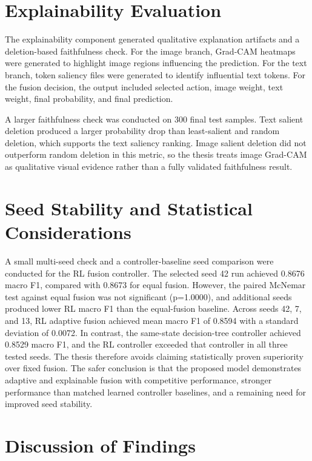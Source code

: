 \section{Explainability Evaluation}


The explainability component generated qualitative explanation artifacts and a deletion-based faithfulness check. For the image branch, Grad-CAM heatmaps were generated to highlight image regions influencing the prediction. For the text branch, token saliency files were generated to identify influential text tokens. For the fusion decision, the output included selected action, image weight, text weight, final probability, and final prediction.


A larger faithfulness check was conducted on 300 final test samples. Text salient deletion produced a larger probability drop than least-salient and random deletion, which supports the text saliency ranking. Image salient deletion did not outperform random deletion in this metric, so the thesis treats image Grad-CAM as qualitative visual evidence rather than a fully validated faithfulness result.


\section{Seed Stability and Statistical Considerations}


A small multi-seed check and a controller-baseline seed comparison were conducted for the RL fusion controller. The selected seed 42 run achieved 0.8676 macro F1, compared with 0.8673 for equal fusion. However, the paired McNemar test against equal fusion was not significant (p=1.0000), and additional seeds produced lower RL macro F1 than the equal-fusion baseline. Across seeds 42, 7, and 13, RL adaptive fusion achieved mean macro F1 of 0.8594 with a standard deviation of 0.0072. In contrast, the same-state decision-tree controller achieved 0.8529 macro F1, and the RL controller exceeded that controller in all three tested seeds. The thesis therefore avoids claiming statistically proven superiority over fixed fusion. The safer conclusion is that the proposed model demonstrates adaptive and explainable fusion with competitive performance, stronger performance than matched learned controller baselines, and a remaining need for improved seed stability.


\section{Discussion of Findings}



